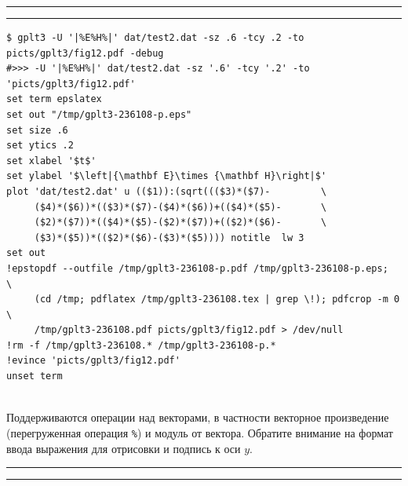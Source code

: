 \documentclass[12pt]{article}
\begin{document}
\noindent\rule{.45\textwidth}{1pt}\hfill {}  \hfill\rule{.45\textwidth}{1pt}

\vspace{3mm}
\noindent
\begin{minipage}[b]{.67\textwidth}
\small
\begin{verbatim}
$ gplt3 -U '|%E%H%|' dat/test2.dat -sz .6 -tcy .2 -to picts/gplt3/fig12.pdf -debug
#>>> -U '|%E%H%|' dat/test2.dat -sz '.6' -tcy '.2' -to 'picts/gplt3/fig12.pdf'
set term epslatex 
set out "/tmp/gplt3-236108-p.eps"
set size .6
set ytics .2
set xlabel '$t$'
set ylabel '$\left|{\mathbf E}\times {\mathbf H}\right|$'
plot 'dat/test2.dat' u (($1)):(sqrt((($3)*($7)-         \
     ($4)*($6))*(($3)*($7)-($4)*($6))+(($4)*($5)-       \
     ($2)*($7))*(($4)*($5)-($2)*($7))+(($2)*($6)-       \
     ($3)*($5))*(($2)*($6)-($3)*($5)))) notitle  lw 3 
set out
!epstopdf --outfile /tmp/gplt3-236108-p.pdf /tmp/gplt3-236108-p.eps;   \
     (cd /tmp; pdflatex /tmp/gplt3-236108.tex | grep \!); pdfcrop -m 0 \
     /tmp/gplt3-236108.pdf picts/gplt3/fig12.pdf > /dev/null
!rm -f /tmp/gplt3-236108.* /tmp/gplt3-236108-p.*
!evince 'picts/gplt3/fig12.pdf'
unset term
\end{verbatim}
\end{minipage}
\\[5mm]
Поддерживаются операции над векторами, в частности векторное произведение (перегруженная операция \verb'%') и модуль от вектора.
Обратите внимание на формат ввода выражения для отрисовки и подпись к оси $y$.
\vspace{3mm}

\newpage
\noindent\rule{.45\textwidth}{1pt}\hfill \raisebox{-.45\height}{\bf № 10.}  \hfill\rule{.45\textwidth}{1pt}
\end{document}

